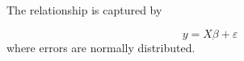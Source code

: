 \documentclass[article]{jss}
\begin{document}
The relationship is captured by

\begin{equation}
y = X \beta + \varepsilon
\end{equation}
where errors are normally distributed.
\end{document}
